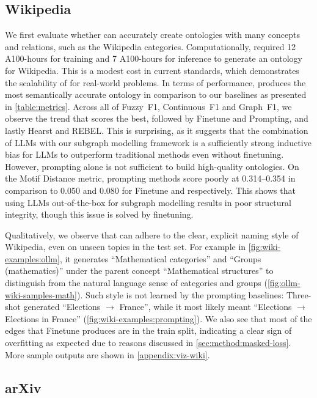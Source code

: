 

\subsection{Wikipedia}

We first evaluate whether \name can accurately create ontologies with many concepts and relations, such as the Wikipedia categories. Computationally, \name required 12 A100-hours for training and 7 A100-hours for inference to generate an ontology for Wikipedia. This is a modest cost in current standards, which demonstrates the scalability of \name for real-world problems.
In terms of performance, \name produces the most semantically accurate ontology in comparison to our baselines as presented in \cref{table:metrics}. Across all of Fuzzy~F1, Continuous~F1 and Graph~F1, we observe the trend that \name scores the best, followed by Finetune and Prompting, and lastly Hearst and REBEL. This is surprising, as it suggests that the combination of LLMs with our subgraph modelling framework is a sufficiently strong inductive bias for LLMs to outperform traditional methods even without finetuning. However, prompting alone is not sufficient to build high-quality ontologies.
On the Motif Distance metric, prompting methods score poorly at 0.314--0.354 in comparison to 0.050 and 0.080 for Finetune and \name respectively. This shows that using LLMs out-of-the-box for subgraph modelling results in poor structural integrity, though this issue is solved by finetuning.



Qualitatively, we observe that \name can adhere to the clear, explicit naming style of Wikipedia, even on unseen topics in the test set. For example in \cref{fig:wiki-examples:ollm}, it generates ``Mathematical categories'' and ``Groups (mathematics)'' under the parent concept ``Mathematical structures'' to distinguish from the natural language sense of categories and groups (\cref{fig:ollm-wiki-samples-math}). Such style is not learned by the prompting baselines: Three-shot generated ``Elections $\to$ France'', while it most likely meant ``Elections $\to$ Elections in France'' (\cref{fig:wiki-examples:prompting}). We also see that most of the edges that Finetune produces are in the train split, indicating a clear sign of overfitting as expected due to reasons discussed in \cref{sec:method:masked-loss}. More sample outputs are shown in \cref{appendix:viz-wiki}.

\subsection{arXiv}

